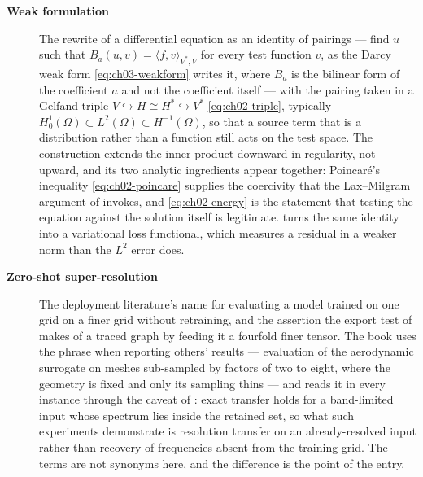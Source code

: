 \begin{description}
\item[\textbf{Weak formulation}] The rewrite of a differential equation as an identity of
pairings --- find $u$ such that $B_{a}(u, v) = \langle f, v \rangle_{V^{*}, V}$ for every
test function $v$, as the Darcy weak form \eqref{eq:ch03-weakform} writes it, where
$B_{a}$ is the bilinear form of the coefficient $a$ and not the coefficient itself ---
with the pairing taken in a Gelfand triple $V \hookrightarrow H \cong H^{*} \hookrightarrow
V^{*}$ \eqref{eq:ch02-triple}, typically $H^{1}_{0}(\Omega) \subset L^{2}(\Omega) \subset
H^{-1}(\Omega)$, so that a source term that is a distribution rather than a function still
acts on the test space. The construction extends the inner product downward in regularity,
not upward, and its two analytic ingredients appear together: Poincar\'e's inequality
\eqref{eq:ch02-poincare} supplies the coercivity that the Lax--Milgram argument of
 invokes, and
\eqref{eq:ch02-energy} is the statement that testing the equation against the solution
itself is legitimate.  turns the
same identity into a variational loss functional, which measures a residual in a weaker norm
than the $L^{2}$ error does. 

\item[\textbf{Zero-shot super-resolution}] The deployment literature's name for evaluating a
model trained on one grid on a finer grid without retraining, and the assertion the export
test of  makes of a traced graph
by feeding it a fourfold finer tensor. The book uses the phrase when reporting others'
results --- evaluation of the aerodynamic surrogate on meshes sub-sampled by factors of two
to eight, where the geometry is fixed and only its sampling thins --- and reads it in every
instance through the caveat of
: exact transfer holds for a
band-limited input whose spectrum lies inside the retained set, so what such experiments
demonstrate is resolution transfer on an already-resolved input rather than recovery of
frequencies absent from the training grid. The terms are not synonyms here, and the
difference is the point of the entry. 

\end{description}

